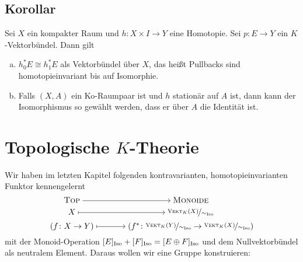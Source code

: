 \subsection[Korollar: Homotopieinvarianz von Pullbacks]{Korollar} %
\label{sub:211}
Sei $X$ ein kompakter Raum und $h \colon X \times I \to Y$ eine Homotopie. Sei $p \colon E \to Y$ ein $K$-Vektorbündel. Dann gilt
\begin{enumerate}[a)]
	\item $h_0^* E \cong h_1^* E$ als Vektorbündel über $X$, das heißt Pullbacks sind homotopieinvariant bis auf Isomorphie.
	\item Falls $(X,A)$ ein Ko-Raumpaar ist und $h$ stationär auf $A$ ist, dann kann der Isomorphismus so gewählt werden, dass er über $A$ die Identität ist.
\end{enumerate}
\newpage

\section{Topologische $K$-Theorie} %
\label{sec:3}
Wir haben im letzten Kapitel folgenden kontravarianten, homotopieinvarianten Funktor kennengelernt
\[
	\begin{tikzcd}[row sep=0.1em, column sep=large,cramped]
		\TOP \rar & \MONOIDE \\
		X \rar[mapsto] & \nicefrac{\VEKT_K(X)}{\sim_{\mathrm{Iso}}} \\
		(f \colon X \to Y) \rar[mapsto] & \enbrace*{f^* \colon \nicefrac{\VEKT_K(Y)}{\sim_{\mathrm{Iso}}} \to \nicefrac{\VEKT_K(X)}{\sim_{\mathrm{Iso}}}} 
	\end{tikzcd}
\]
mit der Monoid-Operation $[E]_{\operatorname{Iso}} + [F]_{\operatorname{Iso}} = [E \oplus F]_{\operatorname{Iso}}$ und dem Nullvektorbündel als neutralem Element. Daraus wollen wir eine Gruppe konstruieren:

